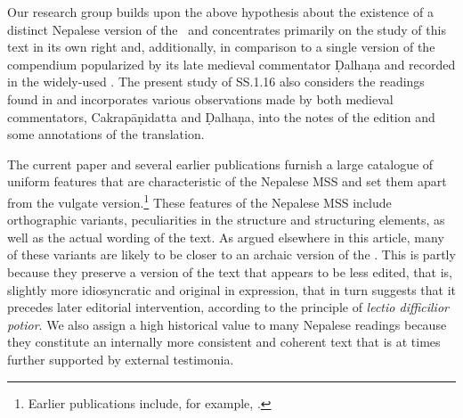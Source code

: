 Our research group builds upon the above hypothesis about the existence of a 
distinct Nepalese version of the \SS\ and concentrates primarily on the study of 
this text in its own right and, additionally, in comparison to a single version of the 
compendium popularized by its late medieval commentator Ḍalhaṇa and 
recorded in the widely-used \cite{vulgate}.  The present study of 
SS.1.16 also considers the readings found in \cite{acar-1939} and incorporates 
various observations made by both medieval commentators, Cakrapāṇidatta and 
Ḍalhaṇa, into the notes of the edition and some annotations of the translation.

The current paper and several earlier publications furnish a large catalogue of
uniform features that are characteristic of the Nepalese MSS and set them apart
from the vulgate version.\footnote{ Earlier publications include, for example,
\cite{hari-2011,wuja-2013,birc-2021,birc-2021a}.} These features of the Nepalese
MSS include orthographic variants, peculiarities in the structure and structuring
elements, as well as the actual wording of the text. As argued elsewhere in this
article, many of these variants are likely to be closer to an archaic version of
the \SS.  This is partly because they preserve a version of the text that appears
to be less edited, that is, slightly more idiosyncratic and original in
expression, that in turn suggests that it precedes later editorial intervention,
according to the principle of \emph{lectio difficilior potior}.
%
We also assign a high historical value to many Nepalese readings  because they
constitute an internally more consistent and coherent text that is at times
further supported by external testimonia.

